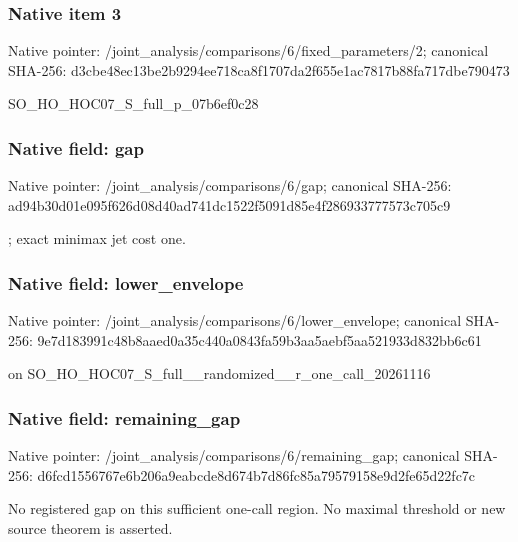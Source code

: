 \documentclass[10pt,a4paper]{article}
\begin{document}
\subsubsection{Native item 3}
Native pointer: /joint\_\allowbreak{}analysis/comparisons/6/fixed\_\allowbreak{}parameters/2; canonical SHA-256: d3cbe48ec13be2b9294ee718ca8f1707da2f655e1ac7817b88fa717dbe790473

\begingroup\raggedright\sloppy SO\_\allowbreak{}HO\_\allowbreak{}HOC07\_\allowbreak{}S\_\allowbreak{}full\_\allowbreak{}p\_\allowbreak{}07b6ef0c28\par\endgroup

\subsubsection{Native field: gap}
Native pointer: /joint\_\allowbreak{}analysis/comparisons/6/gap; canonical SHA-256: ad94b30d01e095f626d08d40ad741dc1522f5091d85e4f286933777573c705c9

\begingroup\raggedright{};\allowbreak{} exact minimax jet cost one.\par\endgroup

\subsubsection{Native field: lower\_\allowbreak{}envelope}
Native pointer: /joint\_\allowbreak{}analysis/comparisons/6/lower\_\allowbreak{}envelope; canonical SHA-256: 9e7d183991c48b8aaed0a35c440a0843fa59b3aa5aebf5aa521933d832bb6c61

\begingroup\raggedright{} on SO\_\allowbreak{}HO\_\allowbreak{}HOC07\_\allowbreak{}S\_\allowbreak{}full\_\allowbreak{}\_\allowbreak{}randomized\_\allowbreak{}\_\allowbreak{}r\_\allowbreak{}one\_\allowbreak{}call\_\allowbreak{}20261116\par\endgroup

\subsubsection{Native field: remaining\_\allowbreak{}gap}
Native pointer: /joint\_\allowbreak{}analysis/comparisons/6/remaining\_\allowbreak{}gap; canonical SHA-256: d6fcd1556767e6b206a9eabcde8d674b7d86fc85a79579158e9d2fe65d22fc7c

\begingroup\raggedright\sloppy No registered gap on this sufficient one-call region. No maximal threshold or new source theorem is asserted.\par\endgroup
\end{document}
